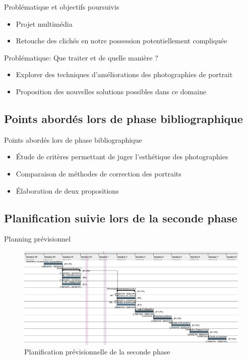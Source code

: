 \documentclass{beamer}
\begin{document}
\begin{frame}{Problématique et objectifs poursuivis}
\begin{itemize}
\item Projet multimédia
\item Retouche des clichés en notre possession potentiellement compliquée
\end{itemize}
\pause
\begin{block}{Problématique: }
Que traiter et de quelle manière ?
\end{block}
\pause
\begin{itemize}
\item Explorer des techniques d'améliorations des photographies de portrait
\item Proposition des nouvelles solutions possibles dans ce domaine
\end{itemize}
\end{frame}

\subsection{Points abordés lors de phase bibliographique}

\begin{frame}{Points abordés lors de phase bibliographique}
\begin{itemize}
\item Étude de critères permettant de juger l'esthétique des photographies
\item Comparaison de méthodes de correction des portraits 
\item Élaboration de deux propositions 
\end{itemize}
\end{frame}

\subsection{Planification suivie lors de la seconde phase}

\begin{frame}{Planning prévisionnel}
\begin{figure}
	\centering
		\includegraphics[width=1\textwidth]{p2_previsionnel}
	\caption{Planification prévisionnelle de la seconde phase}
	\label{fig:PlanningPrevisionnel}
\end{figure}
\end{frame}
\end{document}
